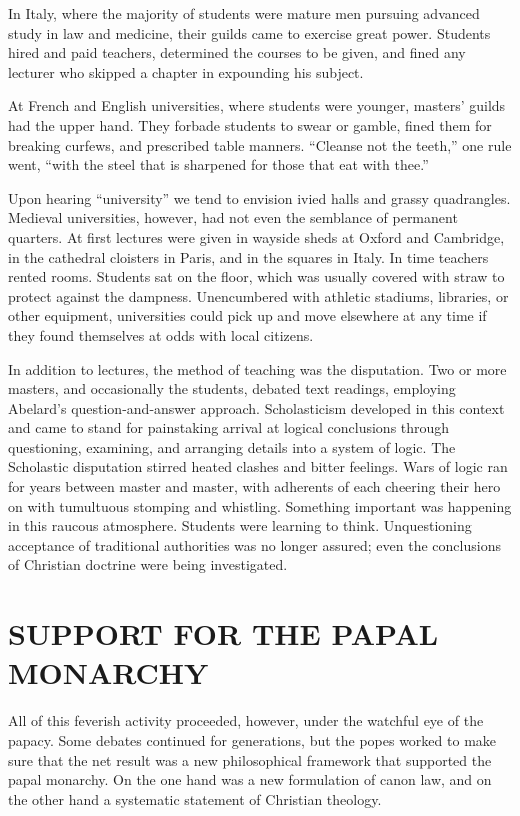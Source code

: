 \begin{blockquote}
In Italy, where the majority of students were mature men pursuing advanced study in law and
medicine, their guilds came to exercise great power. Students hired and paid teachers, determined
the courses to be given, and fined any lecturer who skipped a chapter in expounding his subject.
\end{blockquote}

At French and English universities, where students were younger, masters’ guilds had the upper hand.
They forbade students to swear or gamble, fined them for breaking curfews, and prescribed table
manners. “Cleanse not the teeth,” one rule went, “with the steel that is sharpened for those that
eat with thee.”

Upon hearing “university” we tend to envision ivied halls and grassy quadrangles. Medieval
universities, however, had not even the semblance of permanent quarters. At first lectures were
given in wayside sheds at Oxford and Cambridge, in the cathedral cloisters in Paris, and in the
squares in Italy. In time teachers rented rooms. Students sat on the floor, which was usually
covered with straw to protect against the dampness. Unencumbered with athletic stadiums, libraries,
or other equipment, universities could pick up and move elsewhere at any time if they found
themselves at odds with local citizens.

In addition to lectures, the method of teaching was the disputation. Two or more masters, and
occasionally the students, debated text readings, employing Abelard’s question-and-answer approach.
Scholasticism developed in this context and came to stand for painstaking arrival at logical
conclusions through questioning, examining, and arranging details into a system of logic. The
Scholastic disputation stirred heated clashes and bitter feelings. Wars of logic ran for years
between master and master, with adherents of each cheering their hero on with tumultuous stomping
and whistling. Something important was happening in this raucous atmosphere. Students were learning
to think. Unquestioning acceptance of traditional authorities was no longer assured; even the
conclusions of Christian doctrine were being investigated.

\section{SUPPORT FOR THE PAPAL MONARCHY}

All of this feverish activity proceeded, however, under the watchful eye of the papacy. Some debates
continued for generations, but the popes worked to make sure that the net result was a new
philosophical framework that supported the papal monarchy. On the one hand was a new formulation of
canon law, and on the other hand a systematic statement of Christian theology.

